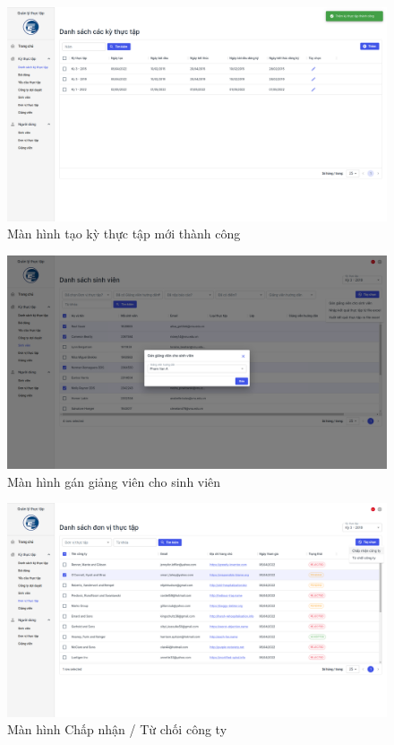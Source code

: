 \documentclass[./../main.tex]{subfiles}
\begin{document}
\begin{figure}[]
	\includegraphics[width=\linewidth]{./images/image20.png}
	\caption{Màn hình tạo kỳ thực tập mới thành công}
	\label{fig:add_term_success}
\end{figure}

\begin{figure}[]
	\includegraphics[width=\linewidth]{./images/image22.png}
	\caption{Màn hình gán giảng viên cho sinh viên}
	\label{fig:assign_lecturer}
\end{figure}

\begin{figure}[]
	\includegraphics[width=\linewidth]{./images/image21.png}
	\caption{Màn hình Chấp nhận / Từ chối công ty}
	\label{fig:reject_or_approve_company}
\end{figure}
\end{document}
